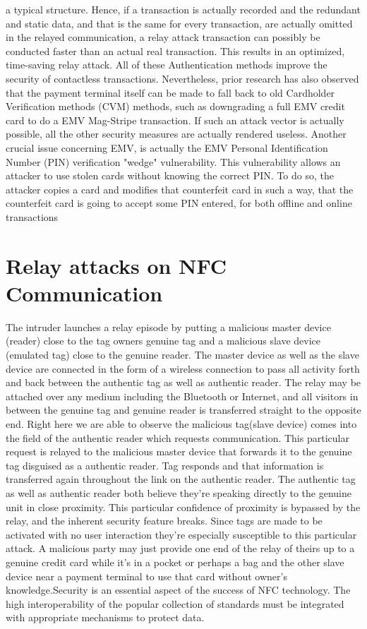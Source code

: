 \documentclass[conference]{IEEEtran}
\begin{document}
a typical structure. Hence, if a transaction is actually recorded and
the redundant and static data, and that is the same for every
transaction, are actually omitted in the relayed communication, a relay
attack transaction can possibly be conducted faster than an actual real transaction. This results in an optimized, time-saving
relay attack.
All of these Authentication methods improve the security of contactless transactions. Nevertheless, prior research has also
observed that the payment terminal itself can be made to fall
back to old Cardholder Verification methods (CVM) methods,
such as downgrading a full EMV credit card to do a
EMV Mag-Stripe transaction. If such an attack vector
is actually possible, all the other security measures are actually rendered useless.
Another crucial issue concerning EMV, is actually the EMV
Personal Identification Number (PIN) verification "wedge" vulnerability. This vulnerability allows an attacker to use stolen
cards without knowing the correct PIN. To do so, the attacker
copies a card and modifies that counterfeit card in such a way,
that the counterfeit card is going to accept some PIN entered, for both
offline and online transactions
\section{Relay attacks on NFC Communication}
The intruder launches a relay episode by putting a malicious master device (reader) close to the tag owners genuine tag and a malicious slave device (emulated tag) close to the genuine reader. The master device as well as the slave device are connected in the form of a wireless connection to pass all activity forth and back between the authentic tag as well as authentic reader. The relay may be attached over any medium including the Bluetooth or Internet, and all visitors in between the genuine tag and genuine reader is transferred straight to the opposite end. Right here we are able to observe the malicious tag(slave device) comes into the field of the authentic reader which requests communication. This particular request is relayed to the malicious master device that forwards it to the genuine tag disguised as a authentic reader. Tag responds and that information is transferred again throughout the link on the authentic reader. The authentic tag as well as authentic reader both believe they're speaking directly to the genuine unit in close proximity. This particular confidence of proximity is bypassed by the relay, and the inherent security feature breaks. Since tags are made to be activated with no user interaction they're especially susceptible to this particular attack. A
malicious party may just provide one end of the relay of theirs up to a genuine credit card while it's in a pocket or perhaps a bag and the other slave device near a payment terminal to use that card without owner's knowledge.Security is an essential aspect of the success of NFC technology. The high interoperability of the popular collection of standards must be integrated with appropriate mechanisms to protect data.
\end{document}
